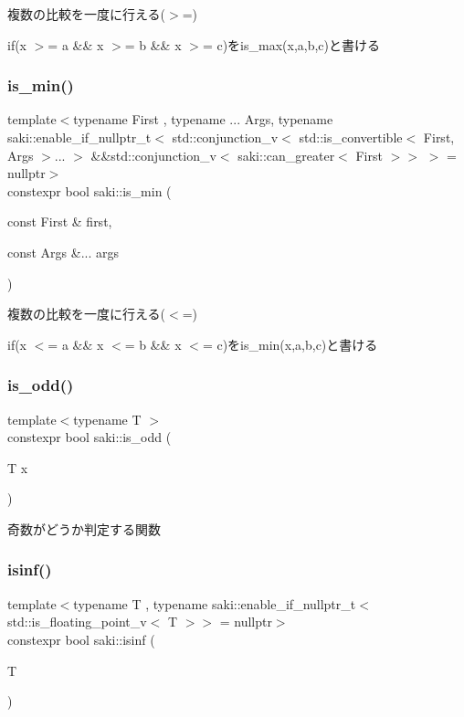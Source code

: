 複数の比較を一度に行える($>$=) 

if(x $>$= a \&\& x $>$= b \&\& x $>$= c)をis\+\_\+max(x,a,b,c)と書ける \mbox{\label{namespacesaki_a7780d542366428c85bfc48fdf43f54ee}} 
\subsubsection{\texorpdfstring{is\+\_\+min()}{is\_min()}}
{\footnotesize\ttfamily template$<$typename First , typename ... Args, typename saki\+::enable\+\_\+if\+\_\+nullptr\+\_\+t$<$ std\+::conjunction\+\_\+v$<$ std\+::is\+\_\+convertible$<$ First, Args $>$... $>$ \&\&std\+::conjunction\+\_\+v$<$ saki\+::can\+\_\+greater$<$ First $>$$>$ $>$  = nullptr$>$ \\
constexpr bool saki\+::is\+\_\+min (\begin{DoxyParamCaption}\item[{const First \&}]{first,  }\item[{const Args \&...}]{args }\end{DoxyParamCaption})}



複数の比較を一度に行える($<$=) 

if(x $<$= a \&\& x $<$= b \&\& x $<$= c)をis\+\_\+min(x,a,b,c)と書ける \mbox{\label{namespacesaki_a03cf21b9e2231e956f8da966f1e09d70}} 
\subsubsection{\texorpdfstring{is\+\_\+odd()}{is\_odd()}}
{\footnotesize\ttfamily template$<$typename T $>$ \\
constexpr bool saki\+::is\+\_\+odd (\begin{DoxyParamCaption}\item[{T}]{x }\end{DoxyParamCaption})}



奇数がどうか判定する関数 

\mbox{\label{namespacesaki_a2168418bb30a857d2d018d0d05c7ace0}} 
\subsubsection{\texorpdfstring{isinf()}{isinf()}}
{\footnotesize\ttfamily template$<$typename T , typename saki\+::enable\+\_\+if\+\_\+nullptr\+\_\+t$<$ std\+::is\+\_\+floating\+\_\+point\+\_\+v$<$ T $>$$>$  = nullptr$>$ \\
constexpr bool saki\+::isinf (\begin{DoxyParamCaption}\item[{T}]{ }\end{DoxyParamCaption})}



